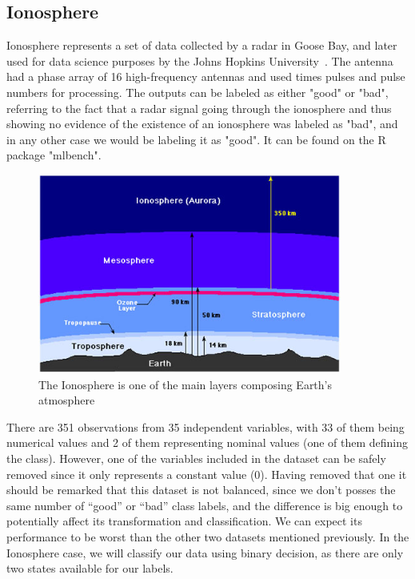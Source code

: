 \subsection{Ionosphere}
\label{subsec:Ionosphere}


Ionosphere represents a set of data collected by a radar in Goose Bay, and later used for data science purposes by the Johns Hopkins University~\cite{citation}. The antenna had a phase array of 16 high-frequency antennas and used times pulses and pulse numbers for processing. The outputs can be labeled as either "good" or "bad", referring to the fact that a radar signal going through the ionosphere and thus showing no evidence of the existence of an ionosphere was labeled as "bad", and in any other case we would be labeling it as "good". It can be found on the R package "mlbench". %
%
\begin{figure}[H]
	\centering
	\includegraphics[width=10cm]{Figuras_tfg/Ionosphere}
	\caption{The Ionosphere is one of the main layers composing Earth's atmosphere}
	\label{fig:figure_pairs_ionosp}
\end{figure}

There are 351 observations from 35 independent variables, with 33 of them being numerical values and 2 of them representing nominal values (one of them defining the class). However, one of the variables included in the dataset can be safely removed since it only represents a constant value (0). Having removed that one it should be remarked that this dataset is not balanced, since we don't posses the same number of ``good'' or ``bad'' class labels, and the difference is big enough to potentially affect its transformation and classification. We can expect its performance to be worst than the other two datasets mentioned previously. In the Ionosphere case, we will classify our data using binary decision, as there are only two states available for our labels. \par

